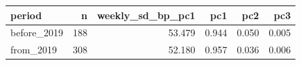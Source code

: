 
\begin{tabular}{lrrrrr}
\toprule
period & n & weekly\_sd\_bp\_pc1 & pc1 & pc2 & pc3\\
\midrule
before\_2019 & 188 & 53.479 & 0.944 & 0.050 & 0.005\\
from\_2019 & 308 & 52.180 & 0.957 & 0.036 & 0.006\\
\bottomrule
\end{tabular}

